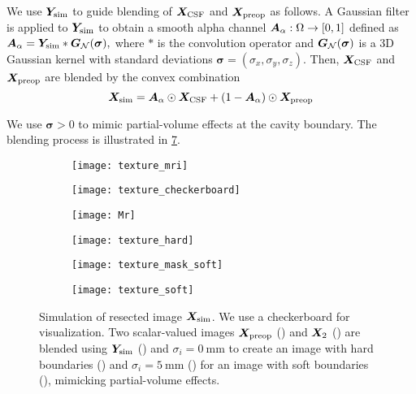 We use $\bm{Y}_{\text{sim}}$ to guide blending of $\bm{X}_{\text{CSF}}$ and $\bm{X}_{\text{preop}}$ as follows.
A Gaussian filter is applied to $\bm{Y}_{\text{sim}}$ to obtain a smooth alpha channel $\bm{A}_\alpha : \Omega \to [0, 1]$ defined as
$
  \bm{A}_\alpha
  = \bm{Y}_{\text{sim}}
  * \bm{G}_{\mathcal{N}}(\bm{\sigma}),
$
where
$*$ is the convolution operator
and $\bm{G}_{\mathcal{N}}(\bm{\sigma})$ is a 3D Gaussian kernel with standard deviations
$\bm{\sigma} = (\sigma_x, \sigma_y, \sigma_z)$.
Then, $\bm{X}_{\text{CSF}}$ and $\bm{X}_{\text{preop}}$ are blended by the convex combination
\begin{equation}
  \bm{X}_{\text{sim}}
  = \bm{A}_\alpha \odot \bm{X}_{\text{CSF}}
  + (1 - \bm{A}_\alpha) \odot \bm{X}_{\text{preop}}
\end{equation}

We use $\bm{\sigma} > 0$ to mimic partial-volume effects at the cavity boundary.
The blending process is illustrated in \cref{fig:texture}.


\begin{figure}
  \centering
  \captionsetup[subfigure]{aboveskip=3pt, belowskip=5pt}

  \begin{subfigure}{0.15\textwidth}
    \texttt{[image: texture\_mri]}
    \caption{\label{fig:tmri}}
  \end{subfigure}
  \begin{subfigure}{0.15\textwidth}
    \texttt{[image: texture\_checkerboard]}
    \caption{\label{fig:checkerboard}}
  \end{subfigure}
  \begin{subfigure}{0.15\textwidth}
    \texttt{[image: Mr]}
    \caption{\label{fig:tmh}}
  \end{subfigure}
  \begin{subfigure}{0.15\textwidth}
    \texttt{[image: texture\_hard]}
    \caption{\label{fig:blh}}
  \end{subfigure}
  \begin{subfigure}{0.15\textwidth}
    \texttt{[image: texture\_mask\_soft]}
    \caption{\label{fig:tms}}
  \end{subfigure}
  \begin{subfigure}{0.15\textwidth}
    \texttt{[image: texture\_soft]}
    \caption{\label{fig:bls}}
  \end{subfigure}

  \caption[Simulation of resected image using alpha blending]{
    Simulation of resected image $\bm{X}_{\text{sim}}$.
    We use a checkerboard for visualization.
    Two scalar-valued images $\bm{X}_{\text{preop}}$ ()
    and $\bm{X}_2$ ()
    are blended using $\bm{Y}_{\text{sim}}$ ()
    and $\sigma_i = \SI{0}{\milli \meter}$ to create an image with hard boundaries ()
    and $\sigma_i = \SI{5}{\milli \meter}$ ()
    for an image with soft boundaries (),
    mimicking partial-volume effects.
  }
  \label{fig:texture}
\end{figure}
